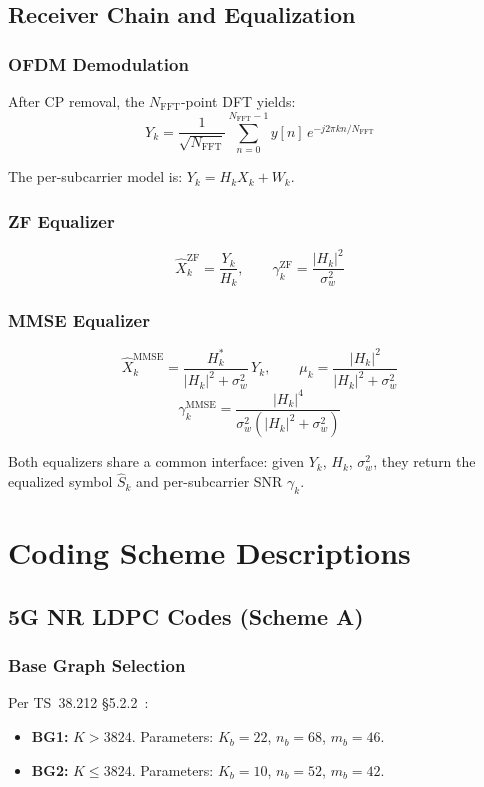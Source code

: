 \documentclass[12pt, a4paper]{article}
\begin{document}
\subsection{Receiver Chain and Equalization}

\subsubsection{OFDM Demodulation}
After CP removal, the $N_{\text{FFT}}$-point DFT yields:
$$Y_k = \frac{1}{\sqrt{N_{\text{FFT}}}} \sum_{n=0}^{N_{\text{FFT}}-1} y[n]\, e^{-j2\pi kn/N_{\text{FFT}}}$$

The per-subcarrier model is: $Y_k = H_k X_k + W_k$.

\subsubsection{ZF Equalizer}
$$\hat{X}_{k}^{\text{ZF}} = \frac{Y_k}{H_k},\qquad \gamma_k^{\text{ZF}} = \frac{|H_k|^2}{\sigma_w^2}$$

\subsubsection{MMSE Equalizer}
$$\hat{X}_{k}^{\text{MMSE}} = \frac{H_k^*}{|H_k|^2 + \sigma_w^2}\,Y_k,\qquad \mu_k = \frac{|H_k|^2}{|H_k|^2+\sigma_w^2}$$
$$\gamma_k^{\text{MMSE}} = \frac{|H_k|^4}{\sigma_w^2(|H_k|^2+\sigma_w^2)}$$

Both equalizers share a common interface: given $Y_k$, $H_k$, $\sigma_w^2$, they return the equalized symbol $\hat{S}_k$ and per-subcarrier SNR $\gamma_k$.

\section{Coding Scheme Descriptions}

\subsection{5G NR LDPC Codes (Scheme A)}

\subsubsection{Base Graph Selection}
Per TS~38.212 \S5.2.2~\cite{3gpp_212}:
\begin{itemize}
    \item \textbf{BG1:} $K > 3824$. Parameters: $K_b=22$, $n_b=68$, $m_b=46$.
    \item \textbf{BG2:} $K \leq 3824$. Parameters: $K_b=10$, $n_b=52$, $m_b=42$.
\end{itemize}
\end{document}
